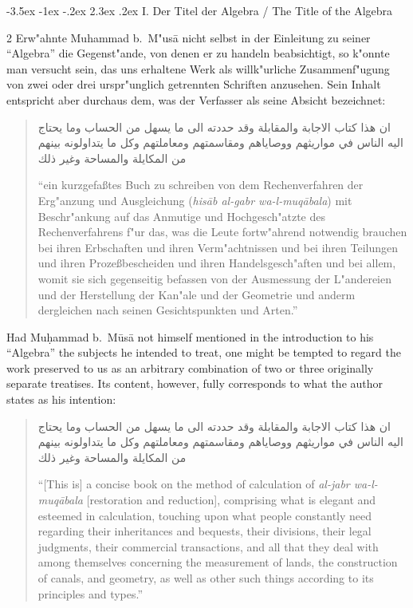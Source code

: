 \documentclass[10pt,a4paper]{article}
\makeatletter
\renewcommand{\switchcolumn}{\syncronize\nointerlineskip\columnbreak}
\newcommand{\RL}[1]{\beginR#1\endR}
\newcommand{\ar}[1]{{\arabicfont\RL{#1}}}
\renewcommand{\section}{\@startsection{section}{1}{\z@}%
  {-3.5ex \@plus -1ex \@minus -.2ex}%
  {2.3ex \@plus .2ex}%
  {\normalfont\Large\bfseries\color{sectioncolor}}}
\newcommand{\enquote}[1]{``#1''}
\makeatother
\begin{document}
\section{I. Der Titel der Algebra / The Title of the Algebra}

\begin{paracol}{2}
Erw"ahnte Muhammad b.\ M"us\=a nicht selbst in der Einleitung zu seiner \enquote{Algebra} die Gegenst"ande, von denen er zu handeln beabsichtigt, so k"onnte man versucht sein, das uns erhaltene Werk als willk"urliche Zusammenf"ugung von zwei oder drei urspr"unglich getrennten Schriften anzusehen. Sein Inhalt entspricht aber durchaus dem, was der Verfasser als seine Absicht bezeichnet:

\begin{quote}
\ar{ان هذا كتاب الاجابة والمقابلة وقد حددته الى ما يسهل من الحساب وما يحتاج اليه الناس في مواريثهم ووصاياهم ومقاسمتهم ومعاملتهم وكل ما يتداولونه بينهم من المكايلة والمساحة وغير ذلك}

\enquote{ein kurzgefa\ss{}tes Buch zu schreiben von dem Rechenverfahren der Erg"anzung und Ausgleichung (\textit{his\=ab al-gabr wa-l-muq\=abala}) mit Beschr"ankung auf das Anmutige und Hochgesch"atzte des Rechenverfahrens f"ur das, was die Leute fortw"ahrend notwendig brauchen bei ihren Erbschaften und ihren Verm"achtnissen und bei ihren Teilungen und ihren Proze\ss{}bescheiden und ihren Handelsgesch"aften und bei allem, womit sie sich gegenseitig befassen von der Ausmessung der L"andereien und der Herstellung der Kan"ale und der Geometrie und anderm dergleichen nach seinen Gesichtspunkten und Arten.}
\end{quote}
\switchcolumn
Had Mu\d{h}ammad b.\ M\=us\=a not himself mentioned in the introduction to his ``Algebra'' the subjects he intended to treat, one might be tempted to regard the work preserved to us as an arbitrary combination of two or three originally separate treatises. Its content, however, fully corresponds to what the author states as his intention:

\begin{quote}
\ar{ان هذا كتاب الاجابة والمقابلة وقد حددته الى ما يسهل من الحساب وما يحتاج اليه الناس في مواريثهم ووصاياهم ومقاسمتهم ومعاملتهم وكل ما يتداولونه بينهم من المكايلة والمساحة وغير ذلك}

``[This is] a concise book on the method of calculation of \textit{al-jabr wa-l-muq\=abala} [restoration and reduction], comprising what is elegant and esteemed in calculation, touching upon what people constantly need regarding their inheritances and bequests, their divisions, their legal judgments, their commercial transactions, and all that they deal with among themselves concerning the measurement of lands, the construction of canals, and geometry, as well as other such things according to its principles and types.''
\end{quote}
\end{paracol}
\end{document}
